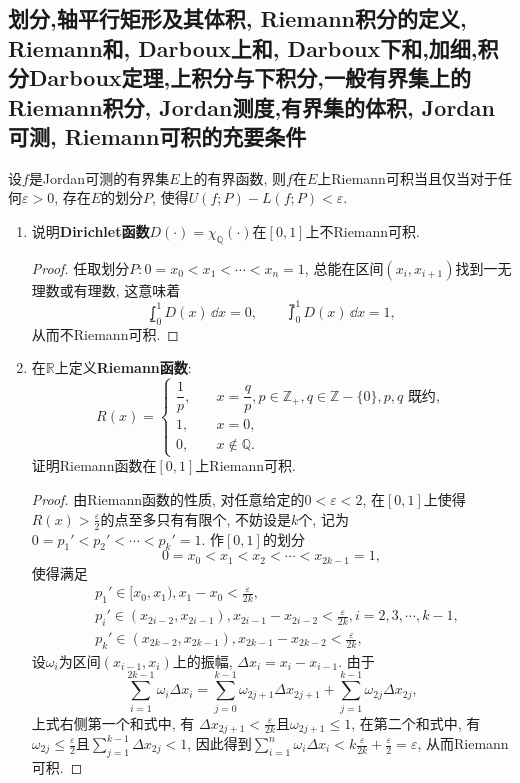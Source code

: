 \subsection{划分,轴平行矩形及其体积, Riemann积分的定义, Riemann和, Darboux上和, Darboux下和,加细,积分Darboux定理,上积分与下积分,一般有界集上的Riemann积分, Jordan测度,有界集的体积, Jordan可测, Riemann可积的充要条件}
\begin{theorem}\label{Th:C81}
设\(f\)是Jordan可测的有界集\(E\)上的有界函数, 
则\(f\)在\(E\)上Riemann可积当且仅当对于任何\(\varepsilon>0\), 
存在\(E\)的划分\(P\), 使得\(U(f;P) - L(f;P)<\varepsilon\).
\end{theorem}
\begin{quiza}
\begin{enumerate}
\item 说明\textbf{Dirichlet函数}\(D(\cdot)=\chi_{\mathbb{Q}}(\cdot)\)在\([0,1]\)上不Riemann可积.
\begin{proof}
	任取划分\(P:0=x_0<x_1<\cdots<x_n=1\), 
    总能在区间\((x_{i},x_{i+1})\)找到一无理数或有理数, 这意味着
    \[\lowint_0^1D(x)\,\dd x=0,\qquad\upint_0^1D(x)\,\dd x=1,\]从而不Riemann可积.
\end{proof}

\item 在\(\mathbb{R}\)上定义\textbf{Riemann函数}:\[R(x)=\begin{cases}
          \dfrac{1}{p},\quad &x=\dfrac{q}{p},p\in \mathbb{Z}_+,q\in\mathbb{Z}-\{0\},p,q\text{ 既约},\\
          1,&x=0,\\
          0,&x\notin \mathbb{Q}.
\end{cases}\]证明Riemann函数在\([0,1]\)上Riemann可积.
\begin{proof}
	由Riemann函数的性质, 对任意给定的\(0<\varepsilon<2\), 
    在\([0,1]\)上使得\(R(x)>\frac{\varepsilon}{2}\)的点至多只有有限个, 
    不妨设是\(k\)个, 记为\(0=p_1'<p_2'<\cdots<p_k'=1\). 
    作\([0,1]\)的划分\[0=x_0<x_1<x_2<\cdots<x_{2k-1}=1,\]使得满足\[\begin{split}
		&p_1'\in[x_0,x_1),x_1-x_0<\frac{\varepsilon}{2k},\\
		&p_i'\in(x_{2i-2},x_{2i-1}),x_{2i-1}-x_{2i-2}<\frac{\varepsilon}{2k},i=2,3,\cdots,k-1,\\
		&p_k'\in(x_{2k-2},x_{2k-1}),x_{2k-1}-x_{2k-2}<\frac{\varepsilon}{2k},
	\end{split}\]
设\(\omega_i\)为区间\((x_{i-1},x_i)\)上的振幅, \(\Delta x_i=x_i-x_{i-1}\). 由于
\[\sum_{i=1}^{2k-1}\omega_i\Delta x_i
=\sum_{j=0}^{k-1}\omega_{2j+1}\Delta x_{2j+1}
+\sum_{j=1}^{k-1}\omega_{2j}\Delta x_{2j},\]
上式右侧第一个和式中, 有
\(\Delta x_{2j+1}<\frac{\varepsilon}{2k}\)且\(\omega_{2j+1}\leqslant 1\), 
在第二个和式中, 有
\(\omega_{2j}\leqslant\frac{\varepsilon}{2}\)且\(\sum_{j=1}^{k-1}\Delta x_{2j}<1\), 
因此得到\(\sum_{i=1}^{n}\omega_i\Delta x_i
<k\frac{\varepsilon}{2k}+\frac{\varepsilon}{2}=\varepsilon\), 从而Riemann可积.
\end{proof}


\end{enumerate}
\end{quiza}
